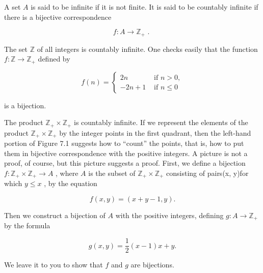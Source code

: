 \begin{definition} A set \(A\) is said to be infinite if it is not finite. It is said to be countably infinite if there is a bijective correspondence

\[
f : A \rightarrow  {\mathbb{Z}}_{ + }\text{ . }
\]
\end{definition}

\begin{centeredblock}
\begin{example} The set \(\mathbb{Z}\) of all integers is countably infinite. One checks easily that the function \(f : \mathbb{Z} \rightarrow  {\mathbb{Z}}_{ + }\) defined by

\[
f\left( n\right)  = \left\{  \begin{array}{ll} {2n} & \text{ if }n > 0, \\ - {2n} + 1 & \text{ if }n \leq  0 \end{array}\right.
\]

is a bijection.
\end{example}
\end{centeredblock}

\begin{centeredblock}
\begin{example} The product \({\mathbb{Z}}_{ + } \times  {\mathbb{Z}}_{ + }\) is countably infinite. If we represent the elements of the product \({\mathbb{Z}}_{ + } \times  {\mathbb{Z}}_{ + }\) by the integer points in the first quadrant, then the left-hand portion of Figure 7.1 suggests how to ``count'' the points, that is, how to put them in bijective correspondence with the positive integers. A picture is not a proof, of course, but this picture suggests a proof. First, we define a bijection \(f : {\mathbb{Z}}_{ + } \times  {\mathbb{Z}}_{ + } \rightarrow  A\) , where \(A\) is the subset of \({\mathbb{Z}}_{ + } \times  {\mathbb{Z}}_{ + }\) consisting of pairs(x, y)for which \(y \leq  x\) , by the equation

\[
f\left( {x,y}\right)  = \left( {x + y - 1,y}\right) .
\]

Then we construct a bijection of \(A\) with the positive integers, defining \(g : A \rightarrow  {\mathbb{Z}}_{ + }\) by the formula

\[
g\left( {x,y}\right)  = \frac{1}{2}\left( {x - 1}\right) x + y.
\]

We leave it to you to show that \(f\) and \(g\) are bijections.
\end{example}
\end{centeredblock}

